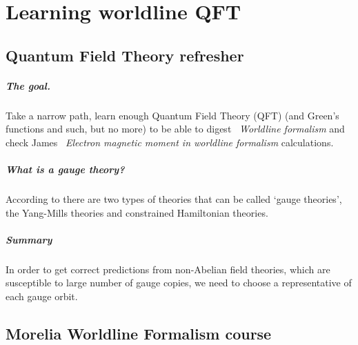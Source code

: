 
\chapter{Learning worldline QFT}
\section{Quantum Field Theory refresher} %

\noindent


\paragraph{The goal.}
    Take a narrow path, learn enough Quantum Field Theory (QFT) (and
    Green's functions and such, but no more) to be able to digest
    ~{\em Worldline formalism} and check James
    ~{\em Electron magnetic moment in
    worldline formalism} calculations.

 \paragraph{What is a gauge theory?}
According to there are two types of theories
that can be called \lq gauge theories\rq, the Yang-Mills theories and
constrained Hamiltonian theories.

\paragraph{Summary}
In order to get correct predictions from non-Abelian field theories,
which are susceptible to large number of gauge copies, we need to choose
a representative of each gauge orbit.

\section{Morelia Worldline Formalism course}
\label{c-MoreliaCourse}

